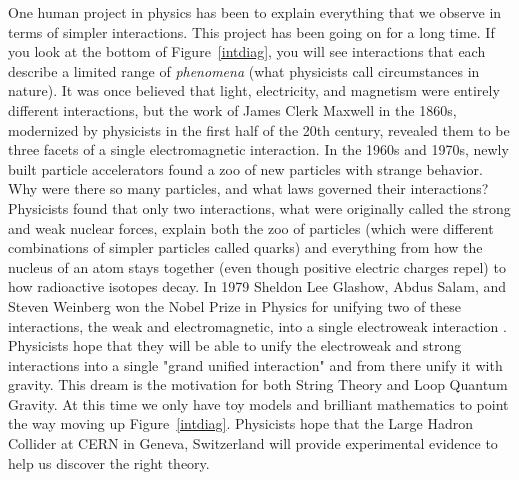 \documentclass[12pt,twocolumn]{article}
\begin{document}
One human project in physics has been to explain everything that we observe in terms of simpler interactions.  This project has been going on for a long time.  If you look at the bottom of Figure~\ref{intdiag}, you will see interactions that each describe a limited range of \emph{phenomena} (what physicists call circumstances in nature).  It was once believed that light, electricity, and magnetism were entirely different interactions, but the work of James Clerk Maxwell in the 1860s, modernized by physicists in the first half of the 20th century, revealed them to be three facets of a single electromagnetic interaction.  In the 1960s and 1970s, newly built particle accelerators found a zoo of new particles with strange behavior.  Why were there so many particles, and what laws governed their interactions?  Physicists found that only two interactions, what were originally called the strong and weak nuclear forces, explain both the zoo of particles (which were different combinations of simpler particles called quarks) and everything from how the nucleus of an atom stays together (even though positive electric charges repel) to how radioactive isotopes decay.  In 1979 Sheldon Lee Glashow, Abdus Salam, and Steven Weinberg won the Nobel Prize in Physics for unifying two of these interactions, the weak and electromagnetic, into a single electroweak interaction \citep{NobelMediaAB:2014}.   Physicists hope that they will be able to unify the electroweak and strong interactions into a single "grand unified interaction" and from there unify it with gravity.  This dream is the motivation for both String Theory and Loop Quantum Gravity.  At this time we only have toy models and brilliant mathematics to point the way moving up Figure~\ref{intdiag}.  Physicists hope that the Large Hadron Collider at CERN in Geneva, Switzerland will provide experimental evidence to help us discover the right theory.
\end{document}

